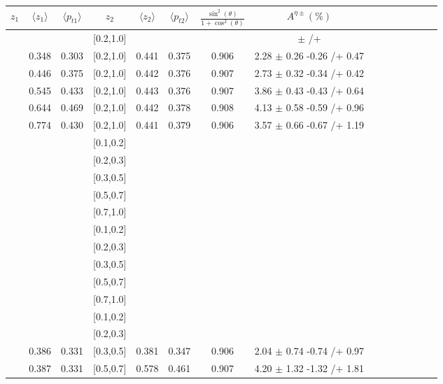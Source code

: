 \begin{table}[H]\scriptsize
\centering
\begin{tabular}{|c| c| c| c| c| c| c| c| c| c|c| c| c| c| c|}
\hline
$z_1$ & $\langle  z_1\rangle$ & $\langle  p_{t1} \rangle$ & $z_2$ & $\langle  z_2 \rangle$ & $\langle  p_{t2}  \rangle$& $\frac{\sin^2(\theta)}{1+\cos^2(\theta)}$ & $A^{\eta\pm}(\%)$  \\ \hline
[0.2,0.3]	&		&		&	[0.2,1.0]	&		&		&		&		$\pm$			/+		\\ \hline
[0.3,0.4]	&	0.348	&	0.303	&	[0.2,1.0]	&	0.441	&	0.375	&	0.906	&	2.28	$\pm$	0.26	-0.26	/+	0.47	\\ \hline
[0.4,0.5]	&	0.446	&	0.375	&	[0.2,1.0]	&	0.442	&	0.376	&	0.907	&	2.73	$\pm$	0.32	-0.34	/+	0.42	\\ \hline
[0.5,0.6]	&	0.545	&	0.433	&	[0.2,1.0]	&	0.443	&	0.376	&	0.907	&	3.86	$\pm$	0.43	-0.43	/+	0.64	\\ \hline
[0.6,0.7]	&	0.644	&	0.469	&	[0.2,1.0]	&	0.442	&	0.378	&	0.908	&	4.13	$\pm$	0.58	-0.59	/+	0.96	\\ \hline
[0.7,1.0]	&	0.774	&	0.430	&	[0.2,1.0]	&	0.441	&	0.379	&	0.906	&	3.57	$\pm$	0.66	-0.67	/+	1.19	\\ \hline
[0.1,0.2]	&		&		&	[0.1,0.2]	&		&		&		&							\\ \hline
[0.1,0.2]	&		&		&	[0.2,0.3]	&		&		&		&							\\ \hline
[0.1,0.2]	&		&		&	[0.3,0.5]	&		&		&		&							\\ \hline
[0.1,0.2]	&		&		&	[0.5,0.7]	&		&		&		&							\\ \hline
[0.1,0.2]	&		&		&	[0.7,1.0]	&		&		&		&							\\ \hline
[0.2,0.3]	&		&		&	[0.1,0.2]	&		&		&		&							\\ \hline
[0.2,0.3]	&		&		&	[0.2,0.3]	&		&		&		&							\\ \hline
[0.2,0.3]	&		&		&	[0.3,0.5]	&		&		&		&							\\ \hline
[0.2,0.3]	&		&		&	[0.5,0.7]	&		&		&		&						\\ \hline
[0.2,0.3]	&		&		&	[0.7,1.0]	&		&		&		&							\\ \hline
[0.3,0.5]	&		&		&	[0.1,0.2]	&		&		&		&						\\ \hline
[0.3,0.5]	&		&		&	[0.2,0.3]	&		&		&		&							\\ \hline
[0.3,0.5]	&	0.386	&	0.331	&	[0.3,0.5]	&	0.381	&	0.347	&	0.906	&	2.04	$\pm$	0.74	-0.74	/+	0.97	\\ \hline
[0.3,0.5]	&	0.387	&	0.331	&	[0.5,0.7]	&	0.578	&	0.461	&	0.907	&	4.20	$\pm$	1.32	-1.32	/+	1.81	\\ \hline

\end{tabular}
\end{table}
